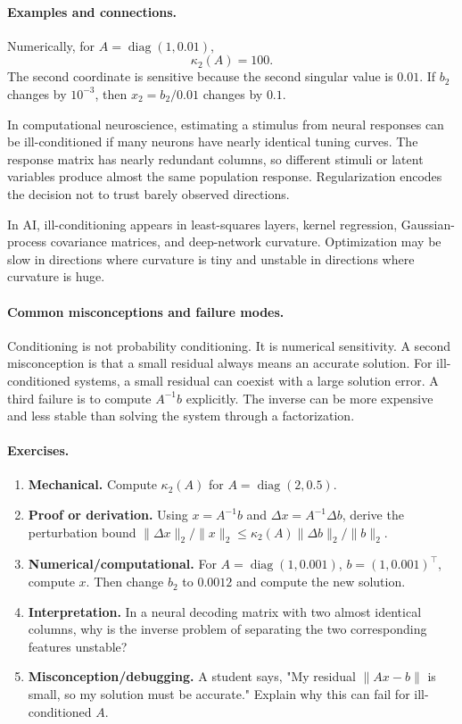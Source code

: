 \paragraph{Examples and connections.}
Numerically, for \(A=\operatorname{diag}(1,0.01)\),
\[
\kappa_2(A)=100.
\]
The second coordinate is sensitive because the second singular value is \(0.01\). If \(b_2\) changes by \(10^{-3}\), then \(x_2=b_2/0.01\) changes by \(0.1\).

In computational neuroscience, estimating a stimulus from neural responses can be ill-conditioned if many neurons have nearly identical tuning curves. The response matrix has nearly redundant columns, so different stimuli or latent variables produce almost the same population response. Regularization encodes the decision not to trust barely observed directions.

In AI, ill-conditioning appears in least-squares layers, kernel regression, Gaussian-process covariance matrices, and deep-network curvature. Optimization may be slow in directions where curvature is tiny and unstable in directions where curvature is huge.

\paragraph{Common misconceptions and failure modes.}
Conditioning is not probability conditioning. It is numerical sensitivity. A second misconception is that a small residual always means an accurate solution. For ill-conditioned systems, a small residual can coexist with a large solution error. A third failure is to compute \(A^{-1}b\) explicitly. The inverse can be more expensive and less stable than solving the system through a factorization.

\paragraph{Exercises.}
\begin{enumerate}[label=\textbf{24.1.\arabic*.}, leftmargin=*]
\item \textbf{Mechanical.} Compute \(\kappa_2(A)\) for \(A=\operatorname{diag}(2,0.5)\).
\item \textbf{Proof or derivation.} Using \(x=A^{-1}b\) and \(\Delta x=A^{-1}\Delta b\), derive the perturbation bound \(\|\Delta x\|_2/\|x\|_2\leq \kappa_2(A)\|\Delta b\|_2/\|b\|_2\).
\item \textbf{Numerical/computational.} For \(A=\operatorname{diag}(1,0.001)\), \(b=(1,0.001)^\top\), compute \(x\). Then change \(b_2\) to \(0.0012\) and compute the new solution.
\item \textbf{Interpretation.} In a neural decoding matrix with two almost identical columns, why is the inverse problem of separating the two corresponding features unstable?
\item \textbf{Misconception/debugging.} A student says, "My residual \(\|Ax-b\|\) is small, so my solution must be accurate." Explain why this can fail for ill-conditioned \(A\).
\end{enumerate}

